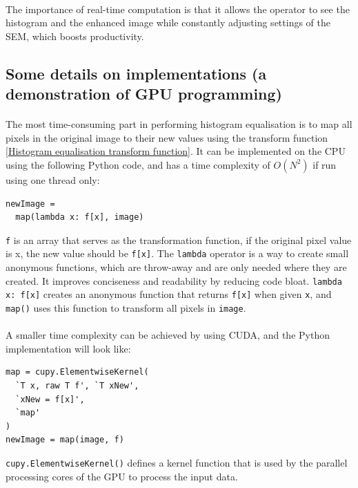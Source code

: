 \documentclass[12pt, twocolumn]{report}
\begin{document}
\paragraph{}
The importance of real-time computation is that it allows the operator to see the histogram and the enhanced image while constantly adjusting settings of the SEM, which boosts productivity.

\subsection{Some details on implementations (a demonstration of GPU programming)}
\paragraph{}
The most time-consuming part in performing histogram equalisation is to map all pixels in the original image to their new values using the transform function \eqref{Histogram equalisation transform function}. It can be implemented on the CPU using the following Python code, and has a time complexity of $O(N^2)$ if run using one thread only:
\begin{lstlisting}
newImage = 
  map(lambda x: f[x], image)
\end{lstlisting}
\lstinline{f} is an array that serves as the transformation function, if the original pixel value is x, the new value should be \lstinline{f[x]}. The \lstinline{lambda} operator is a way to create small anonymous functions, which are throw-away and are only needed where they are created. It improves conciseness and readability by reducing code bloat. \lstinline{lambda x: f[x]} creates an anonymous function that returns \lstinline{f[x]} when given \lstinline{x}, and \lstinline{map()} uses this function to transform all pixels in \lstinline{image}.  

\paragraph{}
A smaller time complexity can be achieved by using CUDA, and the Python implementation will look like:
\begin{lstlisting}
map = cupy.ElementwiseKernel(
  `T x, raw T f', `T xNew',
  `xNew = f[x]',
  `map'
)
newImage = map(image, f)
\end{lstlisting}
\lstinline{cupy.ElementwiseKernel()} defines a kernel function that is used by the parallel processing cores of the GPU to process the input data. 
\end{document}
